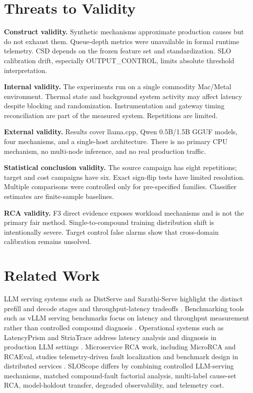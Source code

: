 \documentclass[11pt]{article}
\begin{document}
\section{Threats to Validity}
\textbf{Construct validity.} Synthetic mechanisms approximate production causes but do not exhaust them. Queue-depth metrics were unavailable in formal runtime telemetry. CSD depends on the frozen feature set and standardization. SLO calibration drift, especially OUTPUT\_CONTROL, limits absolute threshold interpretation.

\textbf{Internal validity.} The experiments run on a single commodity Mac/Metal environment. Thermal state and background system activity may affect latency despite blocking and randomization. Instrumentation and gateway timing reconciliation are part of the measured system. Repetitions are limited.

\textbf{External validity.} Results cover llama.cpp, Qwen 0.5B/1.5B GGUF models, four mechanisms, and a single-host architecture. There is no primary CPU mechanism, no multi-node inference, and no real production traffic.

\textbf{Statistical conclusion validity.} The source campaign has eight repetitions; target and cost campaigns have six. Exact sign-flip tests have limited resolution. Multiple comparisons were controlled only for pre-specified families. Classifier estimates are finite-sample baselines.

\textbf{RCA validity.} F3 direct evidence exposes workload mechanisms and is not the primary fair method. Single-to-compound training distribution shift is intentionally severe. Target control false alarms show that cross-domain calibration remains unsolved.

\section{Related Work}
LLM serving systems such as DistServe and Sarathi-Serve highlight the distinct prefill and decode stages and throughput-latency tradeoffs \cite{distserve2024,sarathi2024}. Benchmarking tools such as vLLM serving benchmarks focus on latency and throughput measurement rather than controlled compound diagnosis \cite{vllmbench}. Operational systems such as LatencyPrism and StriaTrace address latency analysis and diagnosis in production LLM settings \cite{latencyprism2026,striatrace2026}. Microservice RCA work, including MicroRCA and RCAEval, studies telemetry-driven fault localization and benchmark design in distributed services \cite{microRCA2020,rcaeval2025}. SLOScope differs by combining controlled LLM-serving mechanisms, matched compound-fault factorial analysis, multi-label cause-set RCA, model-holdout transfer, degraded observability, and telemetry cost.
\end{document}
